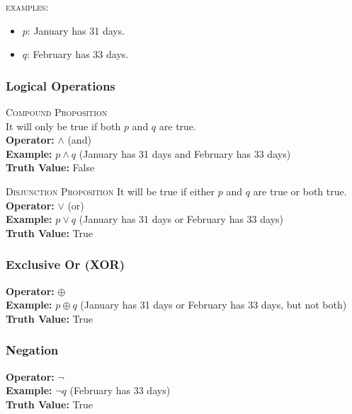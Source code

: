 \documentclass{article}
\begin{document}
\textsc{examples:}
\begin{itemize}
    \item $p$: January has 31 days.
    \item $q$: February has 33 days.
\end{itemize}

\subsubsection{Logical Operations}

\textsc{Compound Proposition} \\
\break
It will only be true if both $p$ and $q$ are true. \\
\break
\textbf{Operator:} $\land$ (and)  \\
\textbf{Example:} $p \land q$ (January has 31 days and February has 33 days)  \\
\textbf{Truth Value:} False

\textsc{Disjunction Proposition}
It will be true if either $p$ and $q$ are true or both true. \\
\break
\textbf{Operator:} $\lor$ (or)  \\
\textbf{Example:} $p \lor q$ (January has 31 days or February has 33 days)  \\
\textbf{Truth Value:} True

\subsubsection*{Exclusive Or (XOR)}
\textbf{Operator:} $\oplus$  \\
\textbf{Example:} $p \oplus q$ (January has 31 days or February has 33 days, but not both)  \\
\textbf{Truth Value:} True

\subsubsection*{Negation}
\textbf{Operator:} $\neg$  \\
\textbf{Example:} $\neg q$ (February has 33 days)  \\
\textbf{Truth Value:} True
\end{document}
